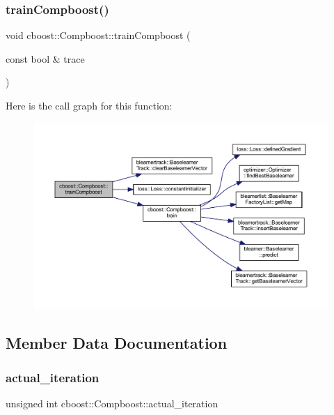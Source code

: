 \subsubsection{\texorpdfstring{train\+Compboost()}{trainCompboost()}}
{\footnotesize\ttfamily void cboost\+::\+Compboost\+::train\+Compboost (\begin{DoxyParamCaption}\item[{const bool \&}]{trace }\end{DoxyParamCaption})}

Here is the call graph for this function\+:\nopagebreak
\begin{figure}[H]
\begin{center}
\leavevmode
\includegraphics[width=350pt]{classcboost_1_1_compboost_a52ea04dec53c68865fdc4a79461d17cb_cgraph}
\end{center}
\end{figure}


\subsection{Member Data Documentation}
\mbox{\label{classcboost_1_1_compboost_a3db81c285c1cd238d0fb65dfc6c00439}} 
\subsubsection{\texorpdfstring{actual\+\_\+iteration}{actual\_iteration}}
{\footnotesize\ttfamily unsigned int cboost\+::\+Compboost\+::actual\+\_\+iteration\hspace{0.3cm}{\ttfamily [private]}}

